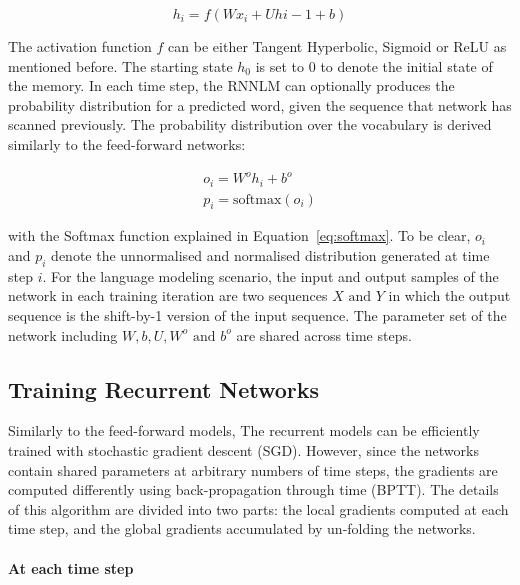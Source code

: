 \begin{equation}
h_i = f(Wx_i +  Uh{i-1} + b)
\end{equation}

The activation function $f$ can be either Tangent Hyperbolic, Sigmoid or ReLU as mentioned before. The starting state $h_0$ is set to 0 to denote the initial state of the memory. In each time step, the RNNLM can optionally produces the probability distribution for a predicted word, given the sequence that network has scanned previously. The probability distribution over the vocabulary is derived similarly to the feed-forward networks:

\begin{equation}
\begin{aligned}
o_i = W^oh_i + b^o \\
p_i = \text{softmax}(o_i)
\end{aligned}
\end{equation}

with the Softmax function explained in Equation~\ref{eq:softmax}. To be clear, $o_i$ and $p_i$ denote the unnormalised and normalised distribution generated at time step $i$. For the language modeling scenario, the input and output samples of the network in each training iteration are two sequences $X \text{ and } Y$ in which the output sequence is the shift-by-1 version of the input sequence. The parameter set of the network including $W, b, U, W^o \text{ and } b^o$ are shared across time steps. 


\subsection{Training Recurrent Networks}

Similarly to the feed-forward models, The recurrent models can be efficiently trained with stochastic gradient descent (SGD). However, since the networks contain shared parameters at arbitrary numbers of time steps, the gradients are computed differently using back-propagation through time (BPTT). The details of this algorithm are divided into two parts: the local gradients computed  at each time step, and the global gradients accumulated by un-folding the networks. 

\paragraph{At each time step}


